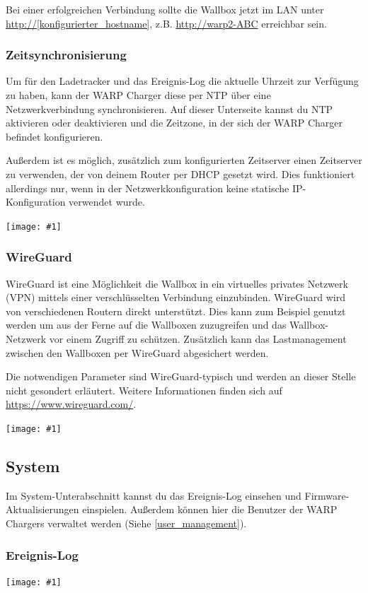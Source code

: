 \documentclass[a4paper,10pt]{article}
\newcommand{\gfx}[1]{\texttt{[image: \#1]}}
\begin{document}
\begin{multicols*}{2}
	Bei einer erfolgreichen Verbindung sollte die Wallbox jetzt im LAN unter
	\url{http://[konfigurierter_hostname]}, z.B. \url{http://warp2-ABC} erreichbar sein.

	\subsubsection{Zeitsynchronisierung}\label{ntp}
	Um für den Ladetracker und das Ereignis-Log die aktuelle Uhrzeit zur Verfügung zu haben, kann der WARP Charger diese per NTP über
	eine Netzwerkverbindung synchronisieren. Auf dieser Unterseite kannst du NTP aktivieren oder deaktivieren und die Zeitzone, in der sich
	der WARP Charger befindet konfigurieren.

	Außerdem ist es möglich, zusätzlich zum konfigurierten Zeitserver einen Zeitserver zu verwenden, der von deinem Router per DHCP gesetzt wird. Dies funktioniert allerdings nur,
	wenn in der Netzwerkkonfiguration keine statische IP-Konfiguration verwendet wurde.

	\gfx{./img_warp2/resized/web_ntp}

	\subsubsection{WireGuard}

	WireGuard ist eine Möglichkeit die Wallbox in ein virtuelles privates Netzwerk (VPN)
	mittels einer verschlüsselten Verbindung einzubinden. WireGuard wird von
	verschiedenen Routern direkt unterstützt. Dies kann zum Beispiel genutzt
	werden um aus der Ferne auf die Wallboxen zuzugreifen und das
	Wallbox-Netzwerk vor einem Zugriff zu schützen. Zusätzlich kann das
	Lastmanagement zwischen den Wallboxen per WireGuard abgesichert werden.

	Die notwendigen Parameter sind WireGuard-typisch und werden an dieser Stelle
	nicht gesondert erläutert. Weitere Informationen finden sich auf
	\url{https://www.wireguard.com/}.

	\gfx{./img_warp2/resized/web_wireguard}

	\subsection{System}
	Im System-Unterabschnitt kannst du das Ereignis-Log einsehen und Firmware-Aktualisierungen einspielen.
	Außerdem können hier die Benutzer der WARP Chargers verwaltet werden (Siehe \ref{user_management}).

	\subsubsection{Ereignis-Log}
	\gfx{./img_warp2/resized/web_event_log}


\end{multicols*}
\end{document}
